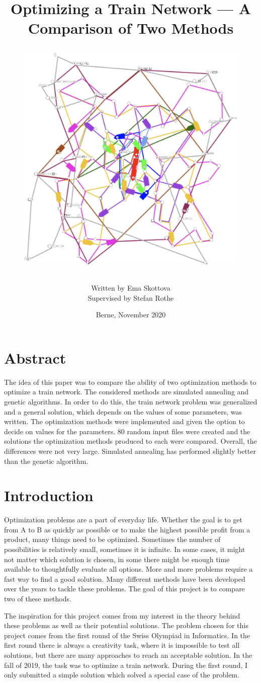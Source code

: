\documentclass[10pt]{scrreprt}
\title{Optimizing a Train Network --- A Comparison of Two Methods\\
\begin{figure}
    \begin{center}
        \includegraphics[scale=0.48]{pictures/simulation_picture.png}
    \end{center}
    \label{Visualization (title image)}
\end{figure}
}
\author{Written by Ema Skottova\\
Supervised by Stefan Rothe}
\date{Berne, November 2020}
\begin{document}
\maketitle


\chapter{Abstract}
The idea of this paper was to compare the ability of two optimization methods to optimize a train network. The considered methods are simulated annealing and genetic algorithms. In order to do this, the train network problem was generalized and a general solution, which depends on the values of some parameters, was written. The optimization methods were implemented and given the option to decide on values for the parameters. 80 random input files were created and the solutions the optimization methods produced to each were compared. Overall, the differences were not very large. Simulated annealing has performed slightly better than the genetic algorithm.

\newpage

\tableofcontents

\newpage

\chapter{Introduction}

Optimization problems are a part of everyday life. Whether the goal is to get from A to B as quickly as possible or to make the highest possible profit from a product, many things need to be optimized. Sometimes the number of possibilities is relatively small, sometimes it is infinite. In some cases, it might not matter which solution is chosen, in some there might be enough time available to thoughtfully evaluate all options. More and more problems require a fast way to find a good solution. Many different methods have been developed over the years to tackle these problems. The goal of this project is to compare two of these methods.

The inspiration for this project comes from my interest in the theory behind these problems as well as their potential solutions. The problem chosen for this project comes from the first round of the Swiss Olympiad in Informatics. In the first round there is always a creativity task, where it is impossible to test all solutions, but there are many approaches to reach an acceptable solution. In the fall of 2019, the task was to optimize a train network. During the first round, I only submitted a simple solution which solved a special case of the problem.
\end{document}
